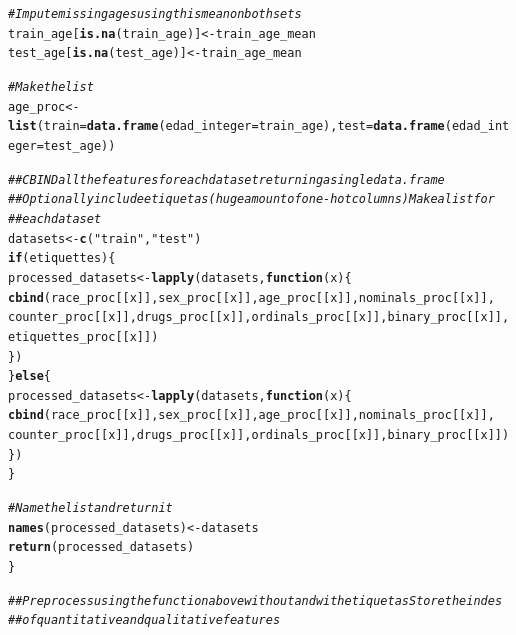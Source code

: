 \documentclass{article}\usepackage[]{graphicx}\usepackage[]{color}
\makeatletter
\newcommand{\hlstr}[1]{\textcolor[rgb]{0.192,0.494,0.8}{#1}}%
\newcommand{\hlcom}[1]{\textcolor[rgb]{0.678,0.584,0.686}{\textit{#1}}}%
\newcommand{\hlstd}[1]{\textcolor[rgb]{0.345,0.345,0.345}{#1}}%
\newcommand{\hlkwa}[1]{\textcolor[rgb]{0.161,0.373,0.58}{\textbf{#1}}}%
\newcommand{\hlkwb}[1]{\textcolor[rgb]{0.69,0.353,0.396}{#1}}%
\newcommand{\hlkwc}[1]{\textcolor[rgb]{0.333,0.667,0.333}{#1}}%
\newcommand{\hlkwd}[1]{\textcolor[rgb]{0.737,0.353,0.396}{\textbf{#1}}}%
\newenvironment{kframe}{%
 \def\at@end@of@kframe{}%
 \ifinner\ifhmode%
  \def\at@end@of@kframe{\end{minipage}}%
  \begin{minipage}{\columnwidth}%
 \fi\fi%
 \def\FrameCommand##1{\hskip\@totalleftmargin \hskip-\fboxsep
 \colorbox{shadecolor}{##1}\hskip-\fboxsep
     \hskip-\linewidth \hskip-\@totalleftmargin \hskip\columnwidth}%
 \MakeFramed {\advance\hsize-\width
   \@totalleftmargin\z@ \linewidth\hsize
   \@setminipage}}%
 {\par\unskip\endMakeFramed%
 \at@end@of@kframe}
\newenvironment{knitrout}{}{} %
\makeatother
\begin{document}
\begin{knitrout}
\begin{kframe}
\begin{alltt}
    \hlcom{# Impute missing ages using this mean on both sets}
    \hlstd{train_age[}\hlkwd{is.na}\hlstd{(train_age)]} \hlkwb{<-} \hlstd{train_age_mean}
    \hlstd{test_age[}\hlkwd{is.na}\hlstd{(test_age)]} \hlkwb{<-} \hlstd{train_age_mean}

    \hlcom{# Make the list}
    \hlstd{age_proc} \hlkwb{<-} \hlkwd{list}\hlstd{(}\hlkwc{train} \hlstd{=} \hlkwd{data.frame}\hlstd{(}\hlkwc{edad_integer} \hlstd{= train_age),} \hlkwc{test} \hlstd{=} \hlkwd{data.frame}\hlstd{(}\hlkwc{edad_integer} \hlstd{= test_age))}

    \hlcom{## CBIND all the features for each dataset returning a single data.frame}
    \hlcom{## Optionally include etiquetas (huge amount of one-hot columns) Make a list for}
    \hlcom{## each dataset}
    \hlstd{datasets} \hlkwb{<-} \hlkwd{c}\hlstd{(}\hlstr{"train"}\hlstd{,} \hlstr{"test"}\hlstd{)}
    \hlkwa{if} \hlstd{(etiquettes) \{}
        \hlstd{processed_datasets} \hlkwb{<-} \hlkwd{lapply}\hlstd{(datasets,} \hlkwa{function}\hlstd{(}\hlkwc{x}\hlstd{) \{}
            \hlkwd{cbind}\hlstd{(race_proc[[x]], sex_proc[[x]], age_proc[[x]], nominals_proc[[x]],}
                \hlstd{counter_proc[[x]], drugs_proc[[x]], ordinals_proc[[x]], binary_proc[[x]],}
                \hlstd{etiquettes_proc[[x]])}
        \hlstd{\})}
    \hlstd{\}} \hlkwa{else} \hlstd{\{}
        \hlstd{processed_datasets} \hlkwb{<-} \hlkwd{lapply}\hlstd{(datasets,} \hlkwa{function}\hlstd{(}\hlkwc{x}\hlstd{) \{}
            \hlkwd{cbind}\hlstd{(race_proc[[x]], sex_proc[[x]], age_proc[[x]], nominals_proc[[x]],}
                \hlstd{counter_proc[[x]], drugs_proc[[x]], ordinals_proc[[x]], binary_proc[[x]])}
        \hlstd{\})}
    \hlstd{\}}

    \hlcom{# Name the list and return it}
    \hlkwd{names}\hlstd{(processed_datasets)} \hlkwb{<-} \hlstd{datasets}
    \hlkwd{return}\hlstd{(processed_datasets)}
\hlstd{\}}

\hlcom{## Preprocess using the function above without and with etiquetas Store the indes}
\hlcom{## of quantitative and qualitative features}
\end{alltt}
\end{kframe}
\end{knitrout}

\newpage
\end{document}

